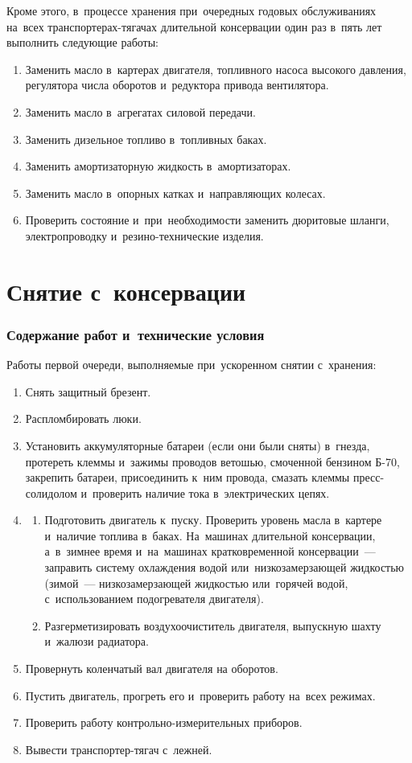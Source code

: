 Кроме этого, в~процессе хранения при~очередных годовых обслуживаниях на~всех транспортерах-тягачах длительной консервации один раз в~пять лет выполнить следующие работы: 
\begin{enumerate}
    \item Заменить масло в~картерах двигателя, топливного насоса высокого давления, регулятора числа оборотов и~редуктора привода вентилятора. 
    \item Заменить масло в~агрегатах силовой передачи. 
    \item Заменить дизельное топливо в~топливных баках. 
    \item Заменить амортизаторную жидкость в~амортизаторах. 
    \item Заменить масло в~опорных катках и~направляющих колесах. 
    \item Проверить состояние и~при~необходимости заменить дюритовые шланги, электропроводку и~резино-технические изделия. 
\end{enumerate}



\section{Снятие с~консервации}
\subsubsection{Содержание работ и~технические условия}
Работы первой очереди, выполняемые при~ускоренном снятии с~хранения: 
\begin{enumerate}
    \item Снять защитный брезент. 
    \item Распломбировать люки. 
    \item Установить аккумуляторные батареи (если они были сняты) в~гнезда, протереть клеммы и~зажимы проводов ветошью, смоченной бензином Б-70, закрепить батареи, присоединить к~ним провода, смазать клеммы пресс-солидолом и~проверить наличие тока в~электрических цепях. 
    \item \begin{enumerate} 
            \item Подготовить двигатель к~пуску. Проверить уровень масла в~картере и~наличие топлива в~баках. На~машинах длительной консервации, а~в~зимнее время и~на~машинах кратковременной консервации~--- заправить систему охлаждения водой или~низкозамерзающей жидкостью (зимой~--- низкозамерзающей жидкостью или~горячей водой, с~использованием подогревателя двигателя). 
            \item Разгерметизировать воздухоочиститель двигателя, выпускную шахту и~жалюзи радиатора. 
        \end{enumerate}
    \item Провернуть коленчатый вал двигателя на  оборотов. 
    \item Пустить двигатель, прогреть его и~проверить работу на~всех режимах. 
    \item Проверить работу контрольно-измерительных приборов. 
    \item Вывести транспортер-тягач с~лежней. 
\end{enumerate}

